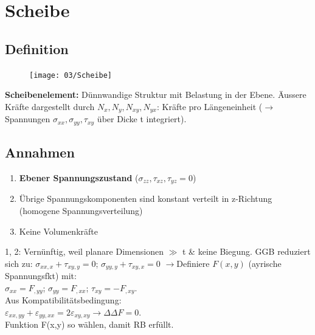 \section{Scheibe}
    \subsection{Definition}
        \begin{figure}
            \vspace{-5mm}
            \texttt{[image: 03/Scheibe]}
        \end{figure}
        \textbf{Scheibenelement:} Dünnwandige Struktur mit Belastung in der Ebene. Äussere Kräfte dargestellt durch $N_x,N_y,N_{xy},N_{yx}$: Kräfte pro Längeneinheit ($\rightarrow$ Spannungen $\sigma_{xx},\sigma_{yy},\tau_{xy}$ über Dicke t integriert).
    
    \subsection{Annahmen}
        \begin{enumerate}[noitemsep]
            \item \textbf{Ebener Spannungszustand} ($\sigma_{zz},\tau_{xz},\tau_{yz}=0$)
            \item Übrige Spannungskomponenten sind konstant verteilt in z-Richtung (homogene Spannungsverteilung)
            \item Keine Volumenkräfte
        \end{enumerate}
        1, 2: Vernünftig, weil planare Dimensionen $\gg$ t \& keine Biegung. GGB reduziert sich zu: $\displaystyle\sigma_{xx,x} + \tau_{xy,y}=0$; $\sigma_{yy,y} + \tau_{xy,x}=0$
        $\rightarrow$Definiere $F(x,y)$ (ayrische Spannungsfkt) mit:\\ $\sigma_{xx}=F_{,yy}$; $\sigma_{yy}=F_{,xx}$; $\tau_{xy}=-F_{,xy}$. 
        \\Aus Kompatibilitätsbedingung:\\ $\varepsilon_{xx,yy}+\varepsilon_{yy,xx}=2\varepsilon_{xy,xy} \rightarrow \Delta\Delta F=0$.
        \\Funktion F(x,y) so wählen, damit RB erfüllt.
